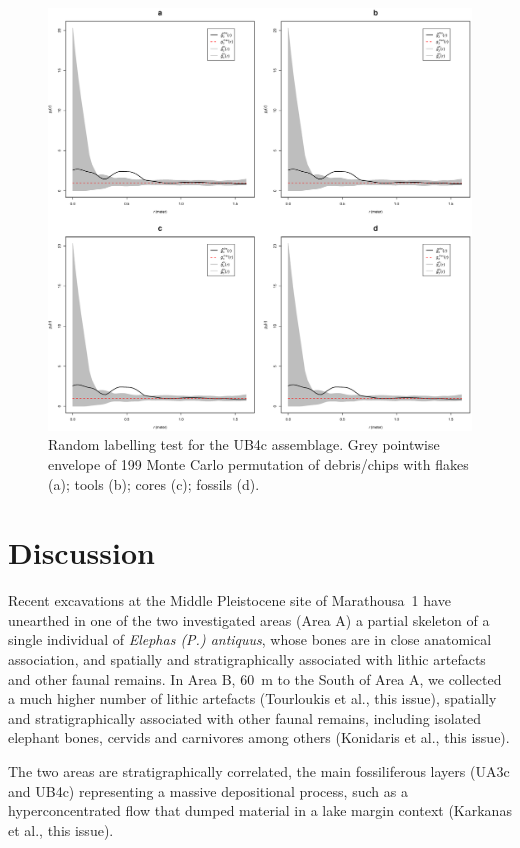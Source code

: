 \documentclass[preprint,authoryear,times]{elsarticle} %
\begin{document}
\begin{figure}[]
  \centering
  \includegraphics[width=1\textwidth]{../artwork/Fig13.eps}
  \caption{Random labelling test for the UB4c assemblage. Grey pointwise envelope of 199 Monte Carlo permutation of debris/chips with flakes (a); tools (b); cores (c); fossils (d).}
  \label{fig:13}
\end{figure}

\section{Discussion}

Recent excavations at the Middle Pleistocene site of Marathousa~1 have unearthed in one of the two investigated areas (Area A) a partial skeleton of a single individual of \emph{Elephas (P.) antiquus}, whose bones are in close anatomical association, and spatially and stratigraphically associated with lithic artefacts and other faunal remains. In Area B, 60~m to the South of Area A, we collected a much higher number of lithic artefacts (Tourloukis et al., this issue), spatially and stratigraphically associated with other faunal remains, including isolated elephant bones, cervids and carnivores among others (Konidaris et al., this issue).

The two areas are stratigraphically correlated, the main fossiliferous layers (UA3c and UB4c) representing a massive depositional process, such as a hyperconcentrated flow that dumped material in a lake margin context (Karkanas et al., this issue).
\end{document}
